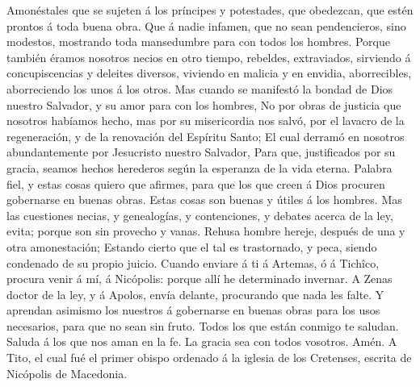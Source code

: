  Amonéstales que se sujeten á los príncipes y potestades,
que obedezcan, que estén prontos á toda buena obra.  Que á
nadie infamen, que no sean pendencieros, sino modestos, mostrando toda
mansedumbre para con todos los hombres.  Porque también
éramos nosotros necios en otro tiempo, rebeldes, extraviados, sirviendo
á concupiscencias y deleites diversos, viviendo en malicia y en envidia,
aborrecibles, aborreciendo los unos á los otros.  Mas
cuando se manifestó la bondad de Dios nuestro Salvador, y su amor para
con los hombres,  No por obras de justicia que nosotros
habíamos hecho, mas por su misericordia nos salvó, por el lavacro de la
regeneración, y de la renovación del Espíritu Santo;  El
cual derramó en nosotros abundantemente por Jesucristo nuestro Salvador,
 Para que, justificados por su gracia, seamos hechos
herederos según la esperanza de la vida eterna.  Palabra
fiel, y estas cosas quiero que afirmes, para que los que creen á Dios
procuren gobernarse en buenas obras. Estas cosas son buenas y útiles á
los hombres.  Mas las cuestiones necias, y genealogías, y
contenciones, y debates acerca de la ley, evita; porque son sin provecho
y vanas.  Rehusa hombre hereje, después de una y otra
amonestación;  Estando cierto que el tal es trastornado,
y peca, siendo condenado de su propio juicio.  Cuando
enviare á ti á Artemas, ó á Tichîco, procura venir á mí, á Nicópolis:
porque allí he determinado invernar.  A Zenas doctor de
la ley, y á Apolos, envía delante, procurando que nada les falte.
 Y aprendan asimismo los nuestros á gobernarse en buenas
obras para los usos necesarios, para que no sean sin fruto.
 Todos los que están conmigo te saludan. Saluda á los que
nos aman en la fe. La gracia sea con todos vosotros. Amén. A Tito, el
cual fué el primer obispo ordenado á la iglesia de los Cretenses,
escrita de Nicópolis de Macedonia.
